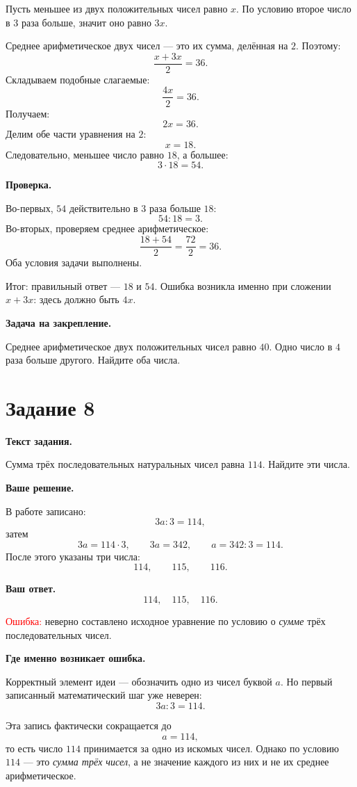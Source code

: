 \documentclass[12pt,a4paper]{article}
\begin{document}
Пусть меньшее из двух положительных чисел равно $x$. По условию второе число в $3$ раза больше, значит оно равно $3x$.

Среднее арифметическое двух чисел --- это их сумма, делённая на $2$. Поэтому:
\[
\frac{x+3x}{2}=36.
\]
Складываем подобные слагаемые:
\[
\frac{4x}{2}=36.
\]
Получаем:
\[
2x=36.
\]
Делим обе части уравнения на $2$:
\[
x=18.
\]
Следовательно, меньшее число равно $18$, а большее:
\[
3\cdot18=54.
\]

\textbf{Проверка.}

Во-первых, $54$ действительно в $3$ раза больше $18$:
\[
54:18=3.
\]
Во-вторых, проверяем среднее арифметическое:
\[
\frac{18+54}{2}=\frac{72}{2}=36.
\]
Оба условия задачи выполнены.

\textcolor{teal!60!black}{Итог:} правильный ответ --- $18$ и $54$. Ошибка возникла именно при сложении $x+3x$: здесь должно быть $4x$.

\textbf{Задача на закрепление.}

Среднее арифметическое двух положительных чисел равно $40$. Одно число в $4$ раза больше другого. Найдите оба числа.

\newpage
{}\label{task:8}
\section*{Задание 8}

\textbf{Текст задания.}

Сумма трёх последовательных натуральных чисел равна $114$. Найдите эти числа.

\textbf{Ваше решение.}

В работе записано:
\[
3a:3=114,
\]
затем
\[
3a=114\cdot3,
\qquad
3a=342,
\qquad
a=342:3=114.
\]
После этого указаны три числа:
\[
114,
\qquad
115,
\qquad
116.
\]

\textbf{Ваш ответ.}
\[
114,
\quad
115,
\quad
116.
\]

\textcolor{red}{Ошибка:} неверно составлено исходное уравнение по условию о \emph{сумме} трёх последовательных чисел.

\textbf{Где именно возникает ошибка.}

Корректный элемент идеи --- обозначить одно из чисел буквой $a$. Но первый записанный математический шаг уже неверен:
\[
3a:3=114.
\]

Эта запись фактически сокращается до
\[
a=114,
\]
то есть число $114$ принимается за одно из искомых чисел. Однако по условию $114$ --- это \emph{сумма трёх чисел}, а не значение каждого из них и не их среднее арифметическое.
\end{document}
